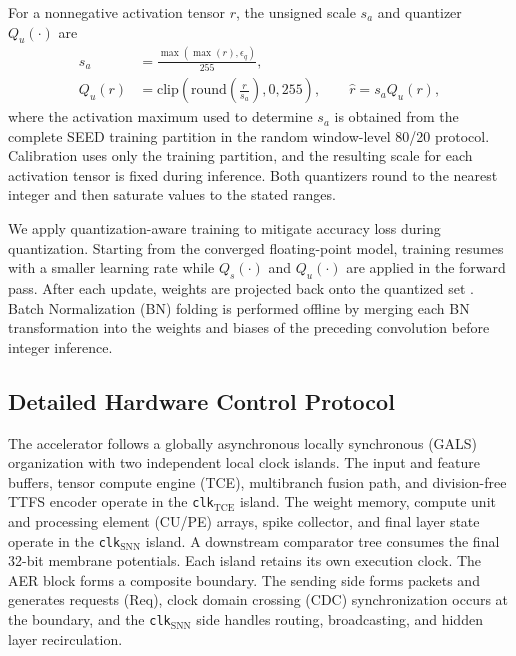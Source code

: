 \documentclass[12pt]{article}
\begin{document}
For a nonnegative activation tensor $r$, the unsigned scale $s_a$ and quantizer $Q_u(\cdot)$ are
\begin{equation}
\begin{aligned}
s_a &= \frac{\max\!\left(\max(r),\epsilon_q\right)}{255},\\
Q_u(r) &= \mathrm{clip}\!\left(\mathrm{round}\!\left(\frac{r}{s_a}\right),0,255\right),
\qquad \hat{r}=s_a Q_u(r),
\end{aligned}
\label{eq:quant_a}
\end{equation}
where the activation maximum used to determine $s_a$ is obtained from the complete SEED training partition in the random window-level 80/20 protocol. Calibration uses only the training partition, and the resulting scale for each activation tensor is fixed during inference. Both quantizers round to the nearest integer and then saturate values to the stated ranges.

We apply quantization-aware training to mitigate accuracy loss during quantization. Starting from the converged floating-point model, training resumes with a smaller learning rate while $Q_s(\cdot)$ and $Q_u(\cdot)$ are applied in the forward pass. After each update, weights are projected back onto the quantized set \cite{ref26}. Batch Normalization (BN) folding is performed offline by merging each BN transformation into the weights and biases of the preceding convolution before integer inference.


\subsection{Detailed Hardware Control Protocol}
The accelerator follows a globally asynchronous locally synchronous (GALS) organization with two independent local clock islands. The input and feature buffers, tensor compute engine (TCE), multibranch fusion path, and division-free TTFS encoder operate in the \texttt{clk}$_{\mathrm{TCE}}$ island. The weight memory, compute unit and processing element (CU/PE) arrays, spike collector, and final layer state operate in the \texttt{clk}$_{\mathrm{SNN}}$ island. A downstream comparator tree consumes the final 32-bit membrane potentials. Each island retains its own execution clock. The AER block forms a composite boundary. The sending side forms packets and generates requests (Req), clock domain crossing (CDC) synchronization occurs at the boundary, and the \texttt{clk}$_{\mathrm{SNN}}$ side handles routing, broadcasting, and hidden layer recirculation.
\end{document}
